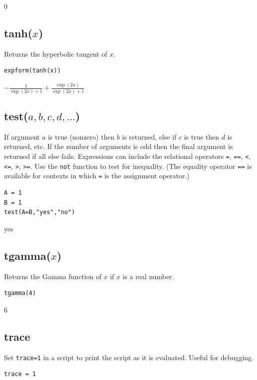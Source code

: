 \documentclass[12pt]{article}
\begin{document}
$0$

\subsection*{tanh($x$)}

Returns the hyperbolic tangent of $x$.

{\color{blue}
\begin{verbatim}
expform(tanh(x))
\end{verbatim}
}

$\displaystyle -\frac{1}{\exp(2x)+1}+\frac{\exp(2x)}{\exp(2x)+1}$

\subsection*{test($a,b,c,d,\ldots$)}

If argument $a$ is true (nonzero) then $b$ is returned, else if $c$ is true then $d$ is returned, etc.
If the number of arguments is odd then the final argument is returned if all else fails.
Expressions can include the relational operators
\verb$=$,
\verb$==$,
\verb$<$,
\verb$<=$,
\verb$>$,
\verb$>=$.
Use the
\verb$not$
function to test for inequality.
(The equality operator
\verb$==$
is available for contexts in which
\verb$=$
is the assignment operator.)

{\color{blue}
\begin{verbatim}
A = 1
B = 1
test(A=B,"yes","no")
\end{verbatim}
}

yes

\subsection*{tgamma($x$)}

Returns the Gamma function of $x$ if $x$ is a real number.

{\color{blue}
\begin{verbatim}
tgamma(4)
\end{verbatim}
}

$6$

\subsection*{trace}

Set {\tt trace=1} in a script to print the script as it is evaluated.
Useful for debugging.

{\color{blue}
\begin{verbatim}
trace = 1
\end{verbatim}
}
\end{document}
